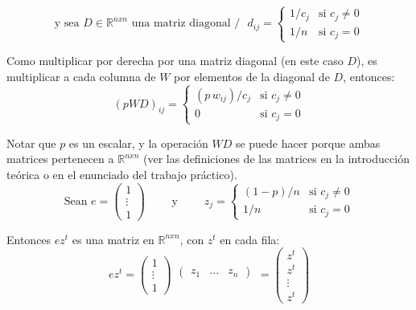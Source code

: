 		\[ \text{y sea $D \in \mathbb{R}^{nxn}$ una matriz diagonal $/$ } d_{ij} =
		        \begin{cases}
		                1/c_j         & \text{si } c_{j}  \neq 0 \\
		                1/n           & \text{si } c_{j}   =   0
		        \end{cases}
		\]

		Como multiplicar por derecha por una matriz diagonal (en este caso $D$), es multiplicar a cada columna de $W$ por elementos de la diagonal de $D$, entonces: \\

		\[ (pWD)_{ij} =
		        \begin{cases}
		                (p \, w_{ij})/c_j 	& \text{si } c_{j}  \neq 0 \\
		                0 			& \text{si } c_{j}   =   0
		        \end{cases}
		\]

		Notar que $p$ es un escalar, y la operación $WD$ se puede hacer porque ambas matrices pertenecen a $\mathbb{R}^{nxn}$ (ver las definiciones de las matrices en la introducción teórica o en el enunciado del trabajo práctico). \\

		\[ \text{Sean }
		        e       = \begin{pmatrix}
		                        1 \\
		                        \vdots \\
		                        1
		                \end  {pmatrix}
		\qquad
			\text{ y }
		\qquad
			z_{j} = \begin{cases}
		                        (1-p)/n & \text{si } c_{j} \neq 0 \\
		                         1   /n & \text{si } c_{j}   =  0
				\end  {cases}
		\]

		Entonces $e z^{t}$ es una matriz en $\mathbb{R}^{nxn}$, con $z^{t}$ en cada fila: \\

		\[
		        e z^{t} 	= 	\begin{pmatrix}
							1 \\
							\vdots \\
							1
						\end  {pmatrix}
						\begin{matrix}
							\begin{pmatrix}z_1 & \hdots & z_n
							\end  {pmatrix}\\\mbox{}
						\end{matrix}
					= 	\begin{pmatrix}
							z^t 	\\
							z^t 	\\
							\vdots 	\\
							z^t
						\end  {pmatrix}
		\]

